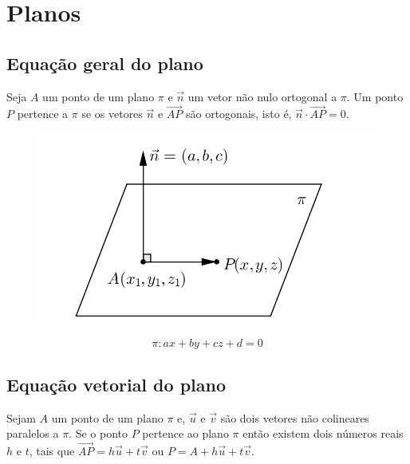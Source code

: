 \chapter{Planos}

\section{Equação geral do plano}

Seja $A$ um ponto de um plano $\pi$ e $\vec n$ um vetor não nulo ortogonal a $\pi$. Um ponto $P$ pertence a $\pi$ se os vetores $\vec n$ e $\overrightarrow{AP}$ são ortogonais, isto é, $\vec n \cdot \overrightarrow{AP}=0$.

\begin{multicols}{2}
\begin{figure}[H]
\centering
\includegraphics[scale=1]{analitica/imagens/plano.png}
\end{figure}

$$\pi: ax + by + cz + d = 0$$

\end{multicols}


\section{Equação vetorial do plano}

Sejam $A$ um ponto de um plano $\pi$ e, $\vec u$ e $\vec v$ são dois vetores não colineares paralelos a $\pi$. Se o ponto $P$ pertence ao plano $\pi$ então existem dois números reais $h$ e $t$, tais que $\overrightarrow{AP}=h\vec u+t\vec v$ ou $P=A+h\vec u+t\vec v$.

